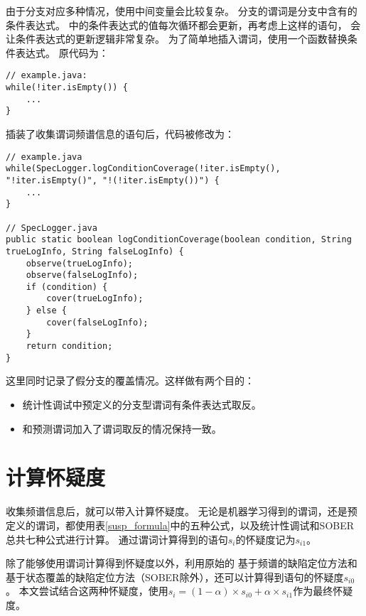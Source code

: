 由于分支对应多种情况，使用中间变量会比较复杂。
分支的谓词是分支中含有的条件表达式。
中的条件表达式的值每次循环都会更新，再考虑上这样的语句，
会让条件表达式的更新逻辑非常复杂。
为了简单地插入谓词，使用一个函数替换条件表达式。
原代码为：
\lstset{language=Java}
\begin{lstlisting}
// example.java:
while(!iter.isEmpty()) {
	...
}
\end{lstlisting}
插装了收集谓词频谱信息的语句后，代码被修改为：
\lstset{language=Java}
\begin{lstlisting}
// example.java
while(SpecLogger.logConditionCoverage(!iter.isEmpty(), "!iter.isEmpty()", "!(!iter.isEmpty())") {
	...
}

// SpecLogger.java
public static boolean logConditionCoverage(boolean condition, String trueLogInfo, String falseLogInfo) {
	observe(trueLogInfo);
	observe(falseLogInfo);
	if (condition) {
		cover(trueLogInfo);
	} else {
		cover(falseLogInfo);
	}
	return condition;
}
\end{lstlisting}
这里同时记录了假分支的覆盖情况。这样做有两个目的：
\begin{itemize}
\item 统计性调试中预定义的分支型谓词有条件表达式取反。
\item 和预测谓词加入了谓词取反的情况保持一致。
\end{itemize}

\section{计算怀疑度}

收集频谱信息后，就可以带入计算怀疑度。
无论是机器学习得到的谓词，还是预定义的谓词，都使用表\ref{susp_formula}中的五种公式，以及统计性调试和SOBER总共七种公式进行计算。
通过谓词计算得到的语句$s_i$的怀疑度记为$s_{i1}$。

除了能够使用谓词计算得到怀疑度以外，利用原始的
基于频谱的缺陷定位方法和基于状态覆盖的缺陷定位方法（SOBER除外），还可以计算得到语句的怀疑度$s_{i0}$。
本文尝试结合这两种怀疑度，使用$s_i = (1 - \alpha) \times s_{i0} + \alpha \times s_{i1}$作为最终怀疑度。

